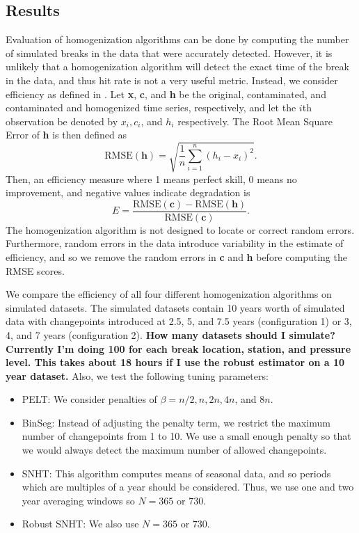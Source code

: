 \documentclass[12pt]{article}
\begin{document}
\begin{doublespacing}
\subsection{Results}

\label{sec:HomResults}

Evaluation of homogenization algorithms can be done by computing the number of simulated breaks in the data that were accurately detected.  However, it is unlikely that a homogenization algorithm will detect the exact time of the break in the data, and thus hit rate is not a very useful metric.  Instead, we consider efficiency as defined in \cite{domonkos13}.  Let \textbf{x}, \textbf{c}, and \textbf{h} be the original, contaminated, and contaminated and homogenized time series, respectively, and let the $i$th observation be denoted by $x_i, c_i$, and $h_i$ respectively.  The Root Mean Square Error of \textbf{h} is then defined as
\begin{equation*}
	\mbox{RMSE}(\textbf{h}) = \sqrt{\frac{1}{n} \sum_{i=1}^n (h_i-x_i)^2}.
\end{equation*}
Then, an efficiency measure where 1 means perfect skill, 0 means no improvement, and negative values indicate degradation is
\begin{equation*}
	E = \frac{\mbox{RMSE}(\textbf{c})-\mbox{RMSE}(\textbf{h})}{\mbox{RMSE}(\textbf{c})}.
\end{equation*}
The homogenization algorithm is not designed to locate or correct random errors.  Furthermore, random errors in the data introduce variability in the estimate of efficiency, and so we remove the random errors in \textbf{c} and \textbf{h} before computing the RMSE scores.  

We compare the efficiency of all four different homogenization algorithms on simulated datasets.  The simulated datasets contain 10 years worth of simulated data with changepoints introduced at 2.5, 5, and 7.5 years (configuration 1) or 3, 4, and 7 years (configuration 2).  \textbf{How many datasets should I simulate?  Currently I'm doing 100 for each break location, station, and pressure level.  This takes about 18 hours if I use the robust estimator on a 10 year dataset.}  Also, we test the following tuning parameters:

\begin{itemize}
	\item PELT: We consider penalties of $\beta=n/2, n, 2n, 4n$, and $8n$.
	\item BinSeg: Instead of adjusting the penalty term, we restrict the maximum number of changepoints from 1 to 10.  We use a small enough penalty so that we would always detect the maximum number of allowed changepoints.
	\item SNHT: This algorithm computes means of seasonal data, and so periods which are multiples of a year should be considered.  Thus, we use one and two year averaging windows so $N=365$ or $730$.
	\item Robust SNHT: We also use $N=365$ or $730$.
\end{itemize}


\end{doublespacing}
\end{document}
